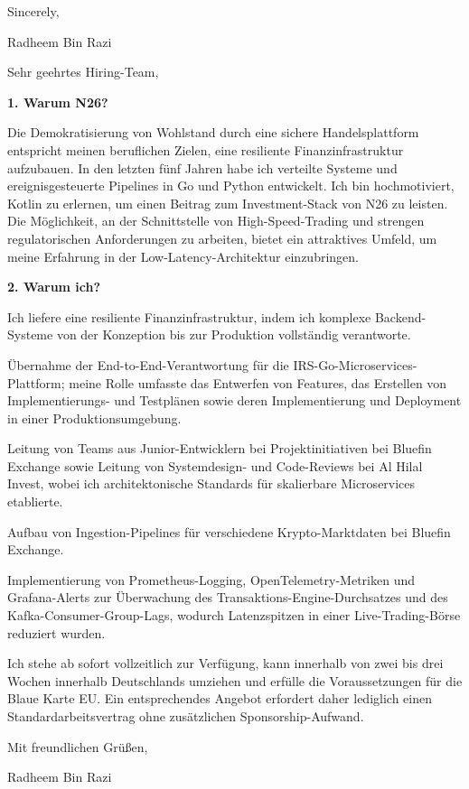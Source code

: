 \documentclass[11pt,a4paper]{coverletter}
\begin{document}
\closing{Sincerely,}{Radheem Bin Razi}

\clearpage
{}


\opening{Sehr geehrtes Hiring-Team,}

\vspace{8pt}\noindent\textbf{1. Warum N26?}\par\vspace{3pt}

Die Demokratisierung von Wohlstand durch eine sichere Handelsplattform entspricht meinen beruflichen Zielen, eine resiliente Finanzinfrastruktur aufzubauen. In den letzten fünf Jahren habe ich verteilte Systeme und ereignisgesteuerte Pipelines in Go und Python entwickelt. Ich bin hochmotiviert, Kotlin zu erlernen, um einen Beitrag zum Investment-Stack von N26 zu leisten. Die Möglichkeit, an der Schnittstelle von High-Speed-Trading und strengen regulatorischen Anforderungen zu arbeiten, bietet ein attraktives Umfeld, um meine Erfahrung in der Low-Latency-Architektur einzubringen.

\vspace{8pt}\noindent\textbf{2. Warum ich?}\par\vspace{3pt}

Ich liefere eine resiliente Finanzinfrastruktur, indem ich komplexe Backend-Systeme von der Konzeption bis zur Produktion vollständig verantworte.

\bullets

  \item Übernahme der End-to-End-Verantwortung für die IRS-Go-Microservices-Plattform; meine Rolle umfasste das Entwerfen von Features, das Erstellen von Implementierungs- und Testplänen sowie deren Implementierung und Deployment in einer Produktionsumgebung.

  \item Leitung von Teams aus Junior-Entwicklern bei Projektinitiativen bei Bluefin Exchange sowie Leitung von Systemdesign- und Code-Reviews bei Al Hilal Invest, wobei ich architektonische Standards für skalierbare Microservices etablierte.

  \item Aufbau von Ingestion-Pipelines für verschiedene Krypto-Marktdaten bei Bluefin Exchange.

  \item Implementierung von Prometheus-Logging, OpenTelemetry-Metriken und Grafana-Alerts zur Überwachung des Transaktions-Engine-Durchsatzes und des Kafka-Consumer-Group-Lags, wodurch Latenzspitzen in einer Live-Trading-Börse reduziert wurden.

\bulletsend

Ich stehe ab sofort vollzeitlich zur Verfügung, kann innerhalb von zwei bis drei Wochen innerhalb Deutschlands umziehen und erfülle die Voraussetzungen für die Blaue Karte EU. Ein entsprechendes Angebot erfordert daher lediglich einen Standardarbeitsvertrag ohne zusätzlichen Sponsorship-Aufwand.

\closing{Mit freundlichen Grüßen,}{Radheem Bin Razi}
\end{document}
